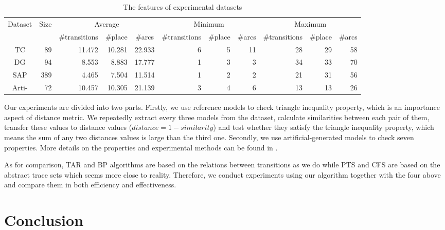 \documentclass{llncs}
\begin{document}
\begin{table}[ht]
\centering
\caption{The features of experimental datasets\label{tab:datasets}}
\scriptsize
\begin{tabular}{|c|r|r|r|r|r|r|r|r|r|r|} \hline
	\multicolumn{1}{|c|}{\multirow{2}{*}{Dataset}} & \multicolumn{1}{c|}{\multirow{2}{*}{Size}} & \multicolumn{3}{|c}{Average} & \multicolumn{3}{|c}{Minimum} & \multicolumn{3}{|c|}{Maximum}\\ \cline{3-11}
	\multicolumn{1}{|c|}{} & \multicolumn{1}{c|}{} & \multicolumn{1}{c|}{\#transitions} & \multicolumn{1}{c|}{\#place} & \multicolumn{1}{c|}{\#arcs} & \multicolumn{1}{c|}{\#transitions} & \multicolumn{1}{c|}{\#place} & \multicolumn{1}{c|}{\#arcs} & \multicolumn{1}{c|}{\#transitions} & \multicolumn{1}{c|}{\#place} & \multicolumn{1}{c|}{\#arcs}\\ \hline
	TC & 89 & 11.472 & 10.281 & 22.933 & 6 & 5 & 11 & 28 & 29 & 58 \\ \hline
	DG & 94 & 8.553 & 8.883 & 17.777 & 1 & 3 & 3 & 34 & 33 & 70 \\ \hline
	SAP & 389 & 4.465 & 7.504 & 11.514 & 1 & 2 & 2 & 21 & 31 & 56 \\ \hline
	Arti- & 72 & 10.457 & 10.305 & 21.139 & 3 & 4 & 6 & 13 & 13 & 26 \\ \hline
\end{tabular}
\end{table}

Our experiments are divided into two parts. Firstly, we use reference models to check triangle inequality property, which is an importance aspect of distance metric. We repeatedly extract every three models from the dataset, calculate similarities between each pair of them, transfer these values to distance values ($distance=1-similarity$) and test whether they satisfy the triangle inequality property, which means the sum of any two distances values is large than the third one. Secondly, we use artificial-generated models to check seven properties. More details on the properties and experimental methods can be found in \cite{wang2013ssdt,wang2014tager,wang2015tar++}.

As for comparison, TAR and BP algorithms are based on the relations between transitions as we do while PTS and CFS are based on the abstract trace sets which seems more close to reality. Therefore, we conduct experiments using our algorithm together with the four above and compare them in both efficiency and effectiveness.

\section{Conclusion}\label{sec:conclusion}




\end{document}
